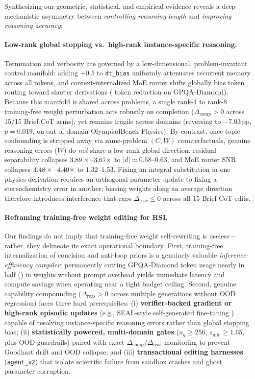 \documentclass[10pt]{article}
\begin{document}
Synthesizing our geometric, statistical, and empirical evidence reveals a deep mechanistic asymmetry between \emph{controlling reasoning length} and \emph{improving reasoning accuracy}:

\paragraph{Low-rank global stopping vs.\ high-rank instance-specific reasoning.}
Termination and verbosity are governed by a low-dimensional, problem-invariant control manifold: adding $+0.5$ to \texttt{dt\_bias} uniformly attenuates recurrent memory across all tokens, and context-internalized MoE router shifts globally bias token routing toward shorter derivations (\GPQATokCut{} token reduction on GPQA-Diamond). Because this manifold is shared across problems, a single rank-1 to rank-8 training-free weight perturbation acts robustly on completion ($\Delta_{\mathrm{comp}} > 0$ across 15/15 Brief-CoT arms), yet remains fragile across domains (reversing to $-7.03$\,pp, $p=0.019$, on out-of-domain OlympiadBench-Physics). By contrast, once topic confounding is stripped away via same-problem $(C, W)$ counterfactuals, genuine reasoning errors ($W$) do \emph{not} share a low-rank global direction: residual separability collapses $3.89\times\text{--}3.67\times$ to $|d|\approx 0.58\text{--}0.63$, and MoE router SNR collapses $3.48\times\text{--}4.40\times$ to $1.32\text{--}1.53$. Fixing an integral substitution in one physics derivation requires an orthogonal parameter update to fixing a stereochemistry error in another; biasing weights along an average direction therefore introduces interference that caps $\Delta_{\mathrm{reas}} \le 0$ across all 15 Brief-CoT edits.

\paragraph{Reframing training-free weight editing for RSI.}
Our findings do not imply that training-free weight self-rewriting is useless---rather, they delineate its exact operational boundary. First, training-free internalization of concision and anti-loop priors is a genuinely valuable \emph{inference-efficiency compiler}: permanently cutting GPQA-Diamond token usage nearly in half (\GPQATokCut{}) in weights without prompt overhead yields immediate latency and compute savings when operating near a tight budget ceiling. Second, genuine capability compounding ($\Delta_{\mathrm{reas}} > 0$ across multiple generations without OOD regression) faces three hard prerequisites: (i) \textbf{verifier-backed gradient or high-rank episodic updates} (e.g., SEAL-style self-generated fine-tuning \citealt{zweiger2025selfadapting}) capable of resolving instance-specific reasoning errors rather than global stopping bias; (ii) \textbf{statistically powered, multi-domain gates} ($n_g \ge 256$, $z_{\min} \ge 1.65$, plus OOD guardrails) paired with exact $\Delta_{\mathrm{comp}} / \Delta_{\mathrm{reas}}$ monitoring to prevent Goodhart drift and OOD collapse; and (iii) \textbf{transactional editing harnesses} (\texttt{agent\_v2}) that isolate scientific failure from sandbox crashes and ghost parameter corruption.
\end{document}
